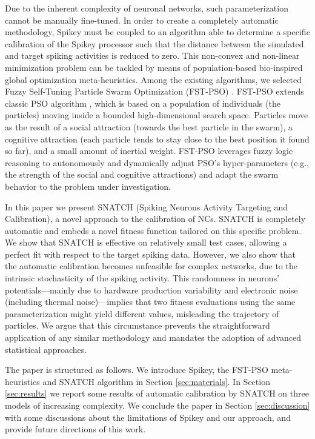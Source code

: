 \documentclass[utf8]{frontiersFPHY} %
\newcommand {\name}{SNATCH}
\begin{document}
Due to the inherent complexity of neuronal networks, such parameterization cannot be manually fine-tuned. 
In order to create a completely automatic methodology, Spikey must be coupled to an algorithm able to determine a specific calibration of the Spikey processor such that the distance between the simulated and target spiking  activities is reduced to zero. 
This non-convex and non-linear minimization problem can be tackled by means of population-based bio-inspired global optimization meta-heuristics.
Among the existing algorithms, we selected Fuzzy Self-Tuning Particle Swarm Optimization (FST-PSO) \cite{Nobile2018}.
FST-PSO extends classic PSO algorithm \cite{poli2007particle}, which is based on a population of individuals (the particles) moving inside a bounded high-dimensional search space.
Particles move as the result of a social attraction (towards the best particle in the swarm), a cognitive attraction (each particle tends to stay close to the best position it found so far), and a small amount of inertial weight.
FST-PSO leverages fuzzy logic reasoning to autonomously and dynamically adjust PSO's hyper-parameters (e.g., the strength of the social and cognitive attractions) and adapt the swarm  behavior to the problem under investigation.

In this paper we present \name{} (Spiking Neurons Activity Targeting and Calibration), a novel approach to the calibration of NCs. 
\name{} is completely automatic and embeds a novel fitness function tailored on this specific problem.
We show that \name{} is effective on relatively small test cases, allowing a perfect fit with respect to the target spiking data.
However, we also show that the automatic calibration becomes unfeasible for  complex networks, due to the intrinsic stochasticity of the spiking activity.
This randomness in neurons' potentials---mainly due to hardware production variability and electronic noise (including thermal noise)---implies that two fitness evaluations using the same parameterization might yield different values, misleading the trajectory of particles.
We argue that this circumstance prevents the straightforward application of any similar methodology and mandates the adoption of advanced statistical approaches. 

The paper is structured as follows. 
We introduce Spikey, the FST-PSO meta-heuristics and SNATCH algorithm in Section \ref{sec:materials}.
In Section \ref{sec:results} we report some results of automatic calibration by SNATCH on three models of increasing complexity.
We conclude the paper in Section \ref{sec:discussion} with some discussions about the limitations of Spikey and our approach, and provide future directions of this work.
\end{document}
